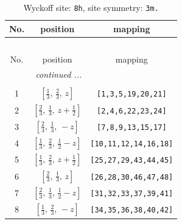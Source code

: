 \documentclass[fleqn,8pt]{jsarticle}
\begin{document}
\begin{longtable}{ccc}
\caption{Wyckoff site: {\tt 8h}, site symmetry: {\tt 3m.}}
 \\
 \hline \hline
No. & position & mapping \\ \hline \endfirsthead

\multicolumn{2}{l}{\tablename\ \thetable{}} \\
 \hline \hline
No. & position & mapping \\ \hline \endhead

 \hline \hline
\multicolumn{2}{r}{\footnotesize\it continued ...} \\ \endfoot

 \hline \hline
\multicolumn{2}{r}{} \\ \endlastfoot

1 & $\left[ \frac{1}{3},\, \frac{2}{3},\, z \right]$ & {\tt [1,3,5,19,20,21]} \\ \hline
2 & $\left[ \frac{2}{3},\, \frac{1}{3},\, z + \frac{1}{2} \right]$ & {\tt [2,4,6,22,23,24]} \\ \hline
3 & $\left[ \frac{2}{3},\, \frac{1}{3},\, - z \right]$ & {\tt [7,8,9,13,15,17]} \\ \hline
4 & $\left[ \frac{1}{3},\, \frac{2}{3},\, \frac{1}{2} - z \right]$ & {\tt [10,11,12,14,16,18]} \\ \hline
5 & $\left[ \frac{1}{3},\, \frac{2}{3},\, z + \frac{1}{2} \right]$ & {\tt [25,27,29,43,44,45]} \\ \hline
6 & $\left[ \frac{2}{3},\, \frac{1}{3},\, z \right]$ & {\tt [26,28,30,46,47,48]} \\ \hline
7 & $\left[ \frac{2}{3},\, \frac{1}{3},\, \frac{1}{2} - z \right]$ & {\tt [31,32,33,37,39,41]} \\ \hline
8 & $\left[ \frac{1}{3},\, \frac{2}{3},\, - z \right]$ & {\tt [34,35,36,38,40,42]} \\
\end{longtable}
\renewcommand{\arraystretch}{1.2}
\end{document}
